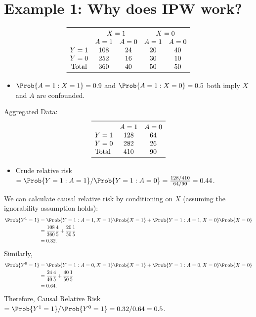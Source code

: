 \section{Example 1: Why does IPW work?}
\[ \begin{array}{ccccc}
            \toprule
                         & \multicolumn{2}{c}{X=1} & \multicolumn{2}{c}{X=0}             \\
                         & A=1                     & A=0                     & A=1 & A=0 \\
            Y=1          & 108                     & 24                      & 20  & 40  \\
            Y=0          & 252                     & 16                      & 30  & 10  \\
            \text{Total} & 360                     & 40                      & 50  & 50  \\
            \bottomrule
      \end{array} \]
\begin{itemize}
      \item $ \Prob{A=1\given X=1}=0.9 $ and $ \Prob{A=1\given X=0}=0.5 $ both imply
            $ X $ and $ A $ are confounded.
\end{itemize}
Aggregated Data:
\[ \begin{array}{lcc}
            \toprule
                         & A=1 & A=0 \\
            Y=1          & 128 & 64  \\
            Y=0          & 282 & 26  \\
            \text{Total} & 410 & 90  \\
            \bottomrule
      \end{array} \]
\begin{itemize}
      \item Crude relative risk $ =\Prob{Y=1\given A=1}/\Prob{Y=1\given A=0}=\frac{128/410}{64/90}=0.44 $.
\end{itemize}
We can calculate causal relative risk by conditioning on $X$
(assuming the ignorability assumption holds):
\begin{align*}
      \Prob{Y^1=1}
       & =\Prob{Y=1\given A=1,X=1}\Prob{X=1}+\Prob{Y=1\given A=1,X=0}\Prob{X=0} \\
       & =\frac{108}{360}\frac{4}{5}+\frac{20}{50}\frac{1}{5}                   \\
       & =0.32.
\end{align*}
Similarly,
\begin{align*}
      \Prob{Y^0=1}
       & =\Prob{Y=1\given A=0,X=1}\Prob{X=1}+\Prob{Y=1\given A=0,X=0}\Prob{X=0} \\
       & =\frac{24}{40}\frac{4}{5}+\frac{40}{50}\frac{1}{5}                     \\
       & =0.64.
\end{align*}
Therefore, Causal Relative Risk $=\Prob{Y^1=1}/\Prob{Y^0=1}=0.32/0.64=0.5$.

